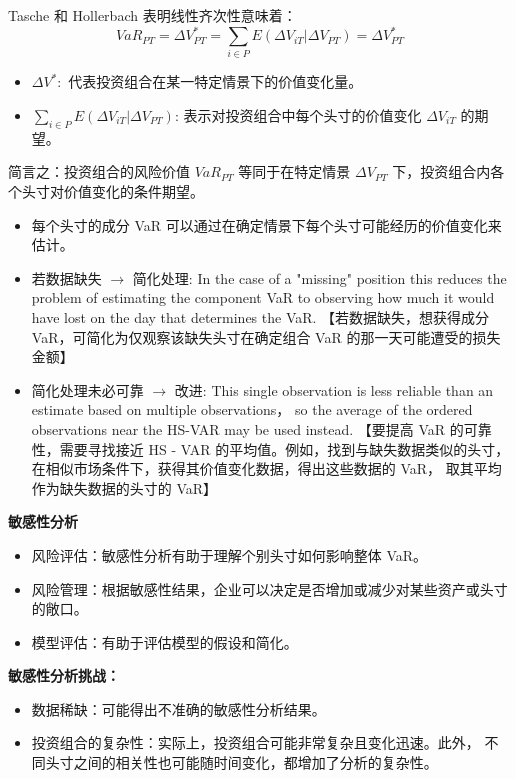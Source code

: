 Tasche 和 Hollerbach 表明线性齐次性意味着：
\[
VaR_{PT} = \Delta V^*_{PT} = \sum_{i \in P} E(\Delta V_{iT} | \Delta V_{PT}) = \Delta V^*_{PT}
\]

\begin{itemize}
    \item \( \Delta V^*: \) 代表投资组合在某一特定情景下的价值变化量。
    \item \( \sum_{i \in P} E(\Delta V_{iT} | \Delta V_{PT}) \): 表示对投资组合中每个头寸的价值变化 \( \Delta V_{iT} \) 的期望。
\end{itemize}

简言之：投资组合的风险价值 \( VaR_{PT} \) 等同于在特定情景 \( \Delta V_{PT} \) 下，投资组合内各个头寸对价值变化的条件期望。

\begin{itemize}
    \item 每个头寸的成分 VaR 可以通过在确定情景下每个头寸可能经历的价值变化来估计。
    \item 若数据缺失 \(\rightarrow\) 简化处理: In the case of a "missing" position this reduces the problem of estimating the component VaR to observing how much it would have lost on the day that determines the VaR. 【若数据缺失，想获得成分 VaR，可简化为仅观察该缺失头寸在确定组合 VaR 的那一天可能遭受的损失金额】

    \item 简化处理未必可靠 \(\rightarrow\) 改进: This single observation is less reliable than an estimate based on multiple observations， so the average of the ordered observations near the HS-VAR may be used instead. 【要提高 VaR 的可靠性，需要寻找接近 HS - VAR 的平均值。例如，找到与缺失数据类似的头寸，在相似市场条件下，获得其价值变化数据，得出这些数据的 VaR， 取其平均作为缺失数据的头寸的 VaR】
    
\end{itemize}

\textbf{敏感性分析}

\begin{itemize}
    \item 风险评估：敏感性分析有助于理解个别头寸如何影响整体 VaR。
    \item 风险管理：根据敏感性结果，企业可以决定是否增加或减少对某些资产或头寸的敞口。
    \item 模型评估：有助于评估模型的假设和简化。
\end{itemize}

\textbf{敏感性分析挑战：}

\begin{itemize}
    \item 数据稀缺：可能得出不准确的敏感性分析结果。
    \item 投资组合的复杂性：实际上，投资组合可能非常复杂且变化迅速。此外， 不同头寸之间的相关性也可能随时间变化，都增加了分析的复杂性。
\end{itemize}

